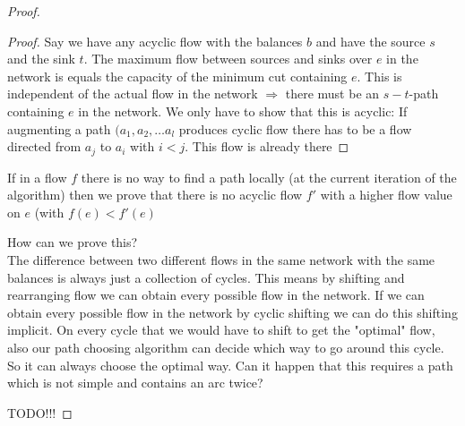 \begin{proof}
\begin{proof}
Say we have any acyclic flow with the balances $b$ and have the source $s$ and the sink $t$. The maximum flow between 
sources and sinks over $e$ in the network is equals the capacity of the minimum cut containing $e$. This is 
independent of the actual flow in the network $\Rightarrow$ there must be an $s-t$-path containing $e$ in the network. 
We only have to show that this is acyclic: If augmenting a path $(a_1, a_2, \dots a_l$ produces cyclic flow there 
has to be a flow directed from $a_j$ to $a_i$ with $i<j$. This flow is already there 
\end{proof}

 
 
 
 
 
 If in a flow $f$ there is no way to find a path locally (at the current iteration of the algorithm) then we 
prove that  there is no acyclic flow $f'$ with a higher flow value on $e$ (with $f(e)< f'(e)$
 
 How can we prove this? \\
 
 The difference between two different flows in the same network with the same balances is always just a collection of 
cycles. This means by shifting and rearranging flow we can obtain every possible flow in the network. If we can obtain 
every possible flow in the network by cyclic shifting we can do this shifting implicit. On every cycle that we would 
have to shift to get the "optimal" flow, also our path choosing algorithm can decide which way to go around this cycle. 
So it can always choose the optimal way.
Can it happen that this requires a path which is not simple and contains an arc twice? 

 
 
%  

 
 TODO!!!
\end{proof}





